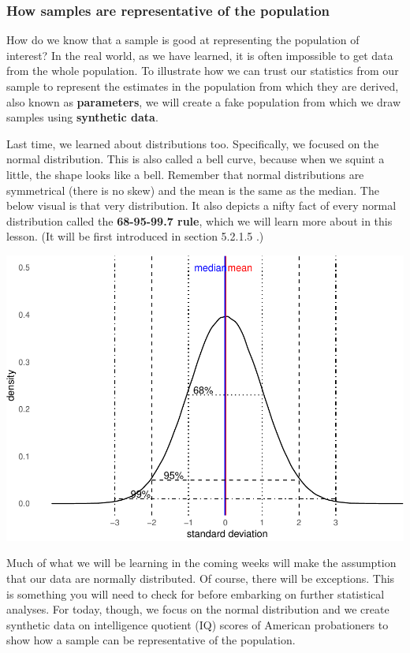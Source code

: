 \documentclass[
]{book}
\begin{document}
\hypertarget{how-samples-are-representative-of-the-population}{%
\subsubsection{How samples are representative of the population}\label{how-samples-are-representative-of-the-population}}

How do we know that a sample is good at representing the population of interest? In the real world, as we have learned, it is often impossible to get data from the whole population. To illustrate how we can trust our statistics from our sample to represent the estimates in the population from which they are derived, also known as \textbf{parameters}, we will create a fake population from which we draw samples using \textbf{synthetic data}.

Last time, we learned about distributions too. Specifically, we focused on the normal distribution. This is also called a bell curve, because when we squint a little, the shape looks like a bell. Remember that normal distributions are symmetrical (there is no skew) and the mean is the same as the median. The below visual is that very distribution. It also depicts a nifty fact of every normal distribution called the \textbf{68-95-99.7 rule}, which we will learn more about in this lesson. (It will be first introduced in section 5.2.1.5 .)

\includegraphics{05-inferential-statistics_files/figure-latex/unnamed-chunk-2-1.pdf}

Much of what we will be learning in the coming weeks will make the assumption that our data are normally distributed. Of course, there will be exceptions. This is something you will need to check for before embarking on further statistical analyses. For today, though, we focus on the normal distribution and we create synthetic data on intelligence quotient (IQ) scores of American probationers to show how a sample can be representative of the population.
\end{document}
